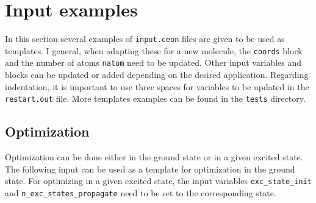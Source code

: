 \section{Input examples}

In this section several examples of \verb+input.ceon+ files are given to be used as templates. I general, when adapting these for a new molecule, the \verb+coords+ block and the number of atoms \verb+natom+ need to be updated. Other input variables and blocks can be updated or added depending on the desired application. Regarding indentation, it is important to use three spaces for variables to be updated in the \verb+restart.out+ file. More templates examples can be found in the \verb+tests+ directory. 

\subsection{Optimization}

Optimization can be done either in the ground state or in a given excited state. The following input can be used as a template for optimization in the ground state. For optimizing in a given excited state, the input variables \verb+exc_state_init+ and \verb+n_exc_states_propagate+ need to be set to the corresponding state.

